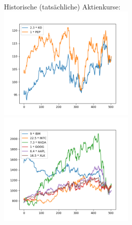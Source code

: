 \documentclass[12pt]{article}
\begin{document}
	\\
	Historische (tatsächliche) Aktienkurse:
	\\
	\includegraphics[width=0.5\textwidth]{Teil1_hist_2y}	
	\includegraphics[width=0.5\textwidth]{Teil2_hist_2y}	
	
	
	
\end{document}
